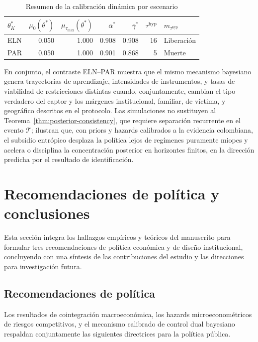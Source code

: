 \documentclass[review,authoryear,12pt]{elsarticle}
\theoremstyle{plain}
\theoremstyle{definition}
\newcommand{\1}{\mathbf{1}}
\begin{document}
\begin{table}[htbp]
\centering
\caption{Resumen de la calibración dinámica por escenario}
\label{tab:calibracion-resumen}
\small
\begin{tabular}{lrrrrrl}
\toprule
$\theta_K^\ast$ & $\mu_0(\theta^\ast)$ & $\mu_{\tau_{\max}}(\theta^\ast)$ & $\bar{\alpha}^\ast$ & $\bar{\gamma}^\ast$ & $\tau^{\mathrm{hyp}}$ & $m_{\tau^{\mathrm{hyp}}}$ \\
\midrule
ELN & 0.050 & 1.000 & 0.908 & 0.908 & 16 & Liberación \\
PAR & 0.050 & 1.000 & 0.901 & 0.868 & 5 & Muerte \\
\bottomrule
\end{tabular}
\end{table}

En conjunto, el contraste ELN--PAR muestra que el mismo mecanismo bayesiano genera trayectorias de aprendizaje, intensidades de instrumentos, y tasas de viabilidad de restricciones distintas cuando, conjuntamente, cambian el tipo verdadero del captor y los márgenes institucional, familiar, de víctima, y geográfico descritos en el protocolo. Las simulaciones no sustituyen al Teorema~\ref{thm:posterior-consistency}, que requiere separación recurrente en el evento $\mathcal{T}$; ilustran que, con priors y hazards calibrados a la evidencia colombiana, el subsidio entrópico desplaza la política lejos de regímenes puramente miopes y acelera o disciplina la concentración posterior en horizontes finitos, en la dirección predicha por el resultado de identificación.

\section{Recomendaciones de política y conclusiones}\label{sec:conclusiones}

Esta sección integra los hallazgos empíricos y teóricos del manuscrito para formular tres recomendaciones de política económica y de diseño institucional, concluyendo con una síntesis de las contribuciones del estudio y las direcciones para investigación futura.

\subsection{Recomendaciones de política}

Los resultados de cointegración macroeconómica, los hazards microeconométricos de riesgos competitivos, y el mecanismo calibrado de control dual bayesiano respaldan conjuntamente las siguientes directrices para la política pública.
\end{document}

